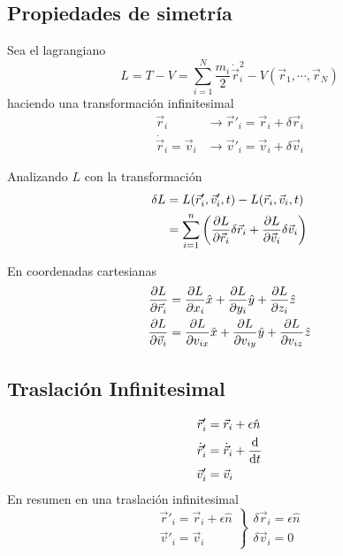 \documentclass[../main]{subfiles}
\begin{document}
\subsection{Propiedades de simetría}
Sea el lagrangiano
\begin{equation}
    L=T-V=\sum_{i=1}^N \dfrac{m_i}{2}\dot{\vec{r}}_i^2-V(\vec{r}_1, \cdots, \vec{r}_N)
\end{equation}
haciendo una transformación infinitesimal
\begin{align}
    \vec{r}_i &\rightarrow \vec{r}'_i=\vec{r}_i+\delta\vec{r}_i \\
    \dot{\vec{r}}_i=\vec{v}_i &\rightarrow \vec{v}'_i=\vec{v}_i+\delta \vec{v}_i 
\end{align}

Analizando $L$ con la transformación
\begin{equation}
    \begin{split}
        \delta L &=L(\vec{r}'_i, \vec{v}'_i, t)-L(\vec{r}_i, \vec{v}_i, t)\\
        &=\sum_{i=1}^n \left(\pdv{L}{\vec{r}_i}\delta \vec{r}_i+\pdv{L}{\vec{v}_i}\delta \vec{v}_i\right)
    \end{split}
\end{equation}

En coordenadas cartesianas 
\begin{align}
    \pdv{L}{\vec{r}_i}&=\pdv{L}{x_i}\hat{x}+\pdv{L}{y_i}\hat{y}+\pdv{L}{z_i}\hat{z}\\
    \pdv{L}{\vec{v}_i}&=\pdv{L}{v_{ix}}\hat{x}+\pdv{L}{v_{iy}}\hat{y}+\pdv{L}{v_{iz}}\hat{z}
\end{align}

\subsection{Traslación Infinitesimal}

\begin{align}
    \vec{r}'_i&=\vec{r}_i+\epsilon\hat{n}\\
    \dot{\vec{r}}'_i&=\dot{\vec{r}}_i+\dv{}{t}(\epsilon\hat{n})\\
    \vec{v}'_i&=\vec{v}_i
\end{align}
En resumen en una traslación infinitesimal
\begin{equation}
    \left.
    \begin{split}
        \vec{r}'_i=\vec{r}_i+\epsilon\hat{n}\\
        \vec{v}'_i=\vec{v}_i
    \end{split}
    \right\}
    \begin{array}{c}
        \delta \vec{r}_i=\epsilon\hat{n}\\
        \delta \vec{v}_i=0
    \end{array}
\end{equation}
\end{document}
